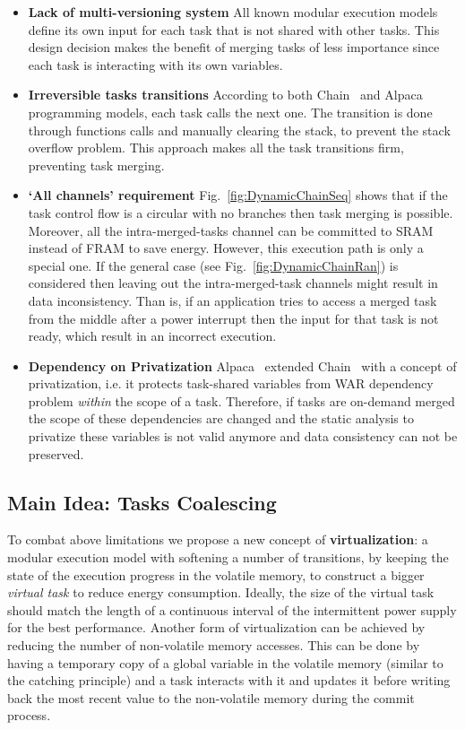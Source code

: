 \begin{itemize}
	\item \textbf{Lack of multi-versioning system} All known modular execution models define its own input for each task that is not shared with other tasks. This design decision makes the benefit of merging tasks of less importance since each task is interacting with its own variables.

	\item \textbf{Irreversible tasks transitions} According to both Chain~\cite{chain} and Alpaca~\cite{alpaca} programming models, each task calls the next one. The transition is done through functions calls and manually clearing the stack, to prevent the stack overflow problem. This approach makes all the task transitions firm, preventing task merging.

	\item \textbf{`All channels' requirement} Fig.~\ref{fig:DynamicChainSeq} shows that if the task control flow is a circular with no branches then task merging is possible. Moreover, all the intra-merged-tasks channel can be committed to SRAM instead of FRAM to save energy. However, this execution path is only a special one. If the general case (see Fig.~\ref{fig:DynamicChainRan}) is considered then leaving out the intra-merged-task channels might result in data inconsistency. Than is, if an application tries to access a merged task from the middle after a power interrupt then the input for that task is not ready, which result in an incorrect execution.

	\item \textbf{Dependency on Privatization} Alpaca~\cite{alpaca} extended Chain~\cite{chain} with a concept of privatization, i.e. it protects task-shared variables from WAR dependency problem \emph{within} the scope of a task. Therefore, if tasks are on-demand merged the scope of these dependencies are changed and the static analysis to privatize these variables is not valid anymore and data consistency can not be preserved.
\end{itemize}

\subsection{Main Idea: Tasks Coalescing}

To combat above limitations we propose a new concept of \textbf{virtualization}: a modular execution model with softening a number of transitions, by keeping the state of the execution progress in the volatile memory, to construct a bigger \emph{virtual task} to reduce energy consumption. Ideally, the size of the virtual task should match the length of a continuous interval of the intermittent power supply for the best performance. Another form of virtualization can be achieved by reducing the number of non-volatile memory accesses. This can be done by having a temporary copy of a global variable in the volatile memory (similar to the catching principle) and a task interacts with it and updates it before writing back the most recent value to the non-volatile memory during the commit process.

